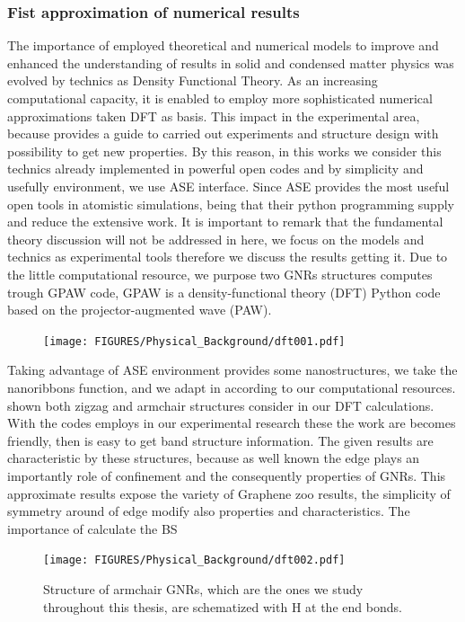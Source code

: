 \subsubsection{Fist approximation of numerical results}
\vspace{-1cm}
The importance of employed theoretical and numerical models to improve and enhanced the understanding of results in solid and condensed matter physics was evolved by technics as Density Functional Theory. As an increasing computational  capacity, it is enabled to employ more sophisticated numerical approximations taken  DFT as basis. This impact in the experimental area, because provides a guide to carried out experiments and structure design\cite{zangwill2015density} with  possibility to get new properties. By this reason, in this works we consider this technics already implemented  in powerful  open codes and  by simplicity and usefully environment, we use ASE interface\cite{ask2017ase}. Since ASE provides the most useful open tools in atomistic simulations, being that their python programming supply and reduce the extensive work. It is important to remark that the fundamental theory discussion will not be addressed in here, we focus on the models and technics as experimental tools therefore we discuss the results getting it. Due to the little computational resource, we purpose two \gls{GNRs}  structures computes trough GPAW code\cite{electronic2010enkovaara,real-space2005mortensen}, GPAW is a density-functional theory (DFT) Python code based on the projector-augmented wave (PAW)\cite{rostgaard2006exact,blochlprojector1994}.
\begin{figure}[ht!]
	\centering
	\texttt{[image: FIGURES/Physical\_Background/dft001.pdf]}
	\caption{}
	\label{fig:intro-dft-structure}
\end{figure}
 Taking advantage of ASE environment provides some nanostructures, we take the nanoribbons function, and we adapt in according to our computational resources.  shown both zigzag and armchair structures consider in our DFT calculations. With the codes employs in our experimental research these the work are becomes friendly, then is easy to get band structure information. The given results are characteristic by these structures, because as well known the edge plays an importantly role of confinement and the consequently properties of GNRs. This approximate results expose the variety of Graphene zoo results, the simplicity of symmetry around of edge modify also properties and characteristics. The importance of calculate the \gls{BS} 
\begin{figure}[ht!]
	\centering
	\texttt{[image: FIGURES/Physical\_Background/dft002.pdf]}
	\caption{Structure of armchair GNRs, which are the ones we study throughout this thesis, are schematized with H at the end bonds. }
	\label{fig:introfig32}
\end{figure}


